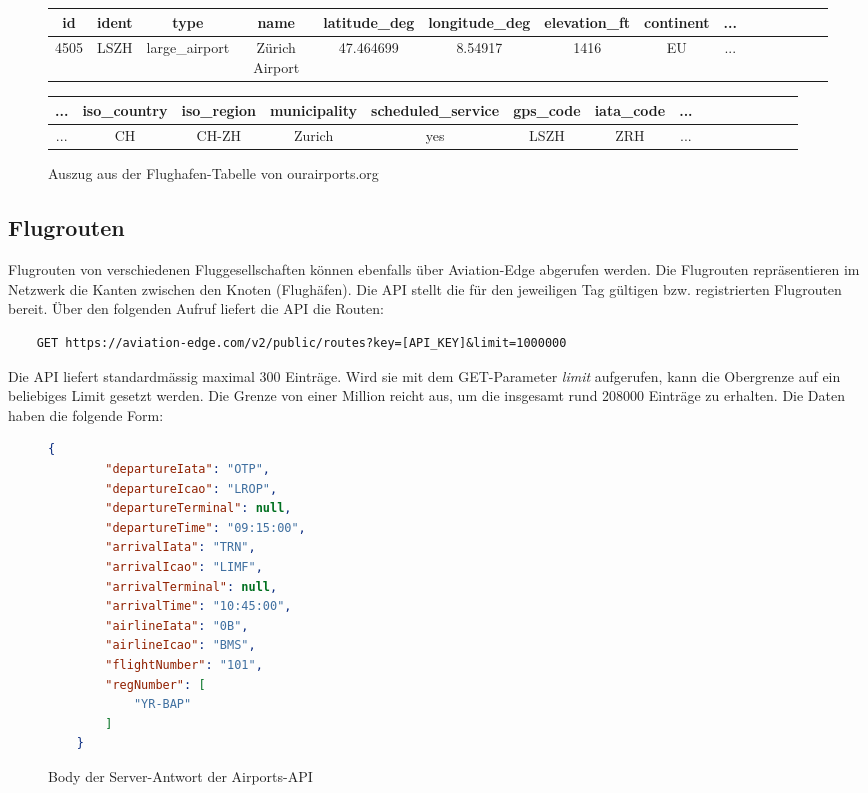 \begin{figure}[ht]
\centering
\label{fig:tableAirportsCSV}
\scriptsize{%
    \begin{tabular}[ht]{c|c|c|c|c|c|c|c|c|c|c|c|c|c|c}
        id & ident & type &	name & latitude\_deg & longitude\_deg & elevation\_ft & continent & ... \\
        \hline
        4505 & LSZH & large\_airport & Zürich Airport & 47.464699 & 8.54917 & 1416 & EU & ...\\
    \end{tabular}

    \newline
    \newline
    \begin{tabular}[ht]{c|c|c|c|c|c|c|c|c|c|c|c|c|c|c}
        ... & iso\_country & iso\_region & municipality & scheduled\_service & gps\_code & iata\_code & ... \\
        \hline
        ... & CH & CH-ZH & Zurich & yes & LSZH & ZRH & ... \\
    \end{tabular}
}
\caption{Auszug aus der Flughafen-Tabelle von ourairports.org}
\end{figure}


\subsection{Flugrouten}
\label{sec:routes}

Flugrouten von verschiedenen Fluggesellschaften können ebenfalls über Aviation-Edge abgerufen werden.
Die Flugrouten repräsentieren im Netzwerk die Kanten zwischen den Knoten (Flughäfen).
Die API stellt die für den jeweiligen Tag gültigen bzw. registrierten Flugrouten bereit.
Über den folgenden Aufruf liefert die API die Routen:

\begin{lstlisting}
    GET https://aviation-edge.com/v2/public/routes?key=[API_KEY]&limit=1000000
\end{lstlisting}

Die API liefert standardmässig maximal 300 Einträge. Wird sie mit dem GET-Parameter \textit{limit} aufgerufen, kann
die Obergrenze auf ein beliebiges Limit gesetzt werden.
Die Grenze von einer Million reicht aus, um die insgesamt rund 208000 Einträge zu erhalten.
Die Daten haben die folgende Form:

\begin{figure}[ht]
    \centering
    \begin{lstlisting}[language=json]
    {
        "departureIata": "OTP",
        "departureIcao": "LROP",
        "departureTerminal": null,
        "departureTime": "09:15:00",
        "arrivalIata": "TRN",
        "arrivalIcao": "LIMF",
        "arrivalTerminal": null,
        "arrivalTime": "10:45:00",
        "airlineIata": "0B",
        "airlineIcao": "BMS",
        "flightNumber": "101",
        "regNumber": [
            "YR-BAP"
        ]
    }
    \end{lstlisting}
    \caption{Body der Server-Antwort der Airports-API}
    \label{lst:routesAPIResponse}
\end{figure}


